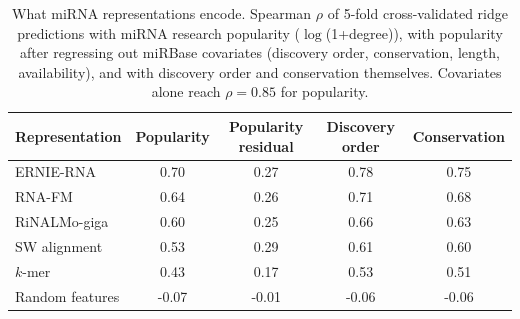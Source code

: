 \begin{table}[t]\centering\small
\caption{What miRNA representations encode. Spearman $\rho$ of 5-fold cross-validated ridge predictions with miRNA research popularity ($\log$(1+degree)), with popularity after regressing out miRBase covariates (discovery order, conservation, length, availability), and with discovery order and conservation themselves. Covariates alone reach $\rho=0.85$ for popularity.}\label{tab:probe}
\begin{tabular}{lcccc}\toprule
Representation & Popularity & Popularity residual & Discovery order & Conservation\\\midrule
ERNIE-RNA & 0.70 & 0.27 & 0.78 & 0.75\\
RNA-FM & 0.64 & 0.26 & 0.71 & 0.68\\
RiNALMo-giga & 0.60 & 0.25 & 0.66 & 0.63\\
SW alignment & 0.53 & 0.29 & 0.61 & 0.60\\
$k$-mer & 0.43 & 0.17 & 0.53 & 0.51\\
Random features & -0.07 & -0.01 & -0.06 & -0.06\\
\bottomrule\end{tabular}\end{table}
